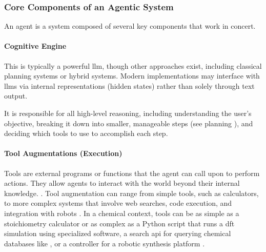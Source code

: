 \subsubsection{Core Components of an Agentic System}\label{sec:arch_agents}

An agent is a system composed of several key components that work in concert.

\paragraph{Cognitive Engine} This is typically a powerful \gls{llm}, though other approaches exist, including classical planning systems or hybrid systems. Modern implementations may interface with \glspl{llm} via internal representations (hidden states) rather than solely through text output. 

It is responsible for all high-level reasoning, including understanding the user's objective, breaking it down into smaller, manageable steps (see planning ), and deciding which tools to use to accomplish each step.

\paragraph{Tool Augmentations (Execution)}
\label{sec:tool_augmentation}
Tools are external programs or functions that the agent can call upon to perform actions. They allow agents to interact with the world beyond their internal knowledge. \autocite{schick2023toolformer, parisi2022talm}. Tool augmentation can range from simple tools, such as calculators, to more complex systems that involve web searches, code execution, and integration with robots \autocite{darvish2025organa, chan2024mle, wei2025browsecomp}. In a chemical context, tools can be as simple as a stoichiometry calculator or as complex as a Python script that runs a \gls{dft} simulation using specialized software, a search \gls{api} for querying chemical databases like , or a controller for a robotic synthesis platform \autocite{boiko2023autonomous, darvish2025organa, bran2024augmenting}.

